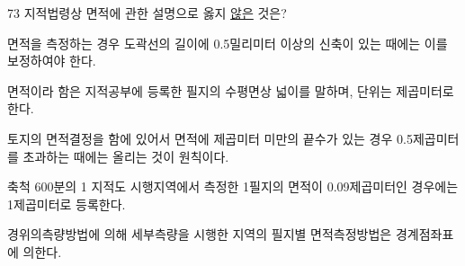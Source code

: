 \begin{question}{73}
지적법령상 면적에 관한 설명으로 옳지 \uline{않은} 것은?
\begin{choices}
  \item 면적을 측정하는 경우 도곽선의 길이에 0.5밀리미터 이상의 신축이 있는 때에는 이를 보정하여야 한다.
  \item 면적이라 함은 지적공부에 등록한 필지의 수평면상 넓이를 말하며, 단위는 제곱미터로 한다.
  \item 토지의 면적결정을 함에 있어서 면적에 제곱미터 미만의 끝수가 있는 경우 0.5제곱미터를 초과하는 때에는 올리는 것이 원칙이다.
  \item 축척 600분의 1 지적도 시행지역에서 측정한 1필지의 면적이 0.09제곱미터인 경우에는 1제곱미터로 등록한다.
  \item 경위의측량방법에 의해 세부측량을 시행한 지역의 필지별 면적측정방법은 경계점좌표에 의한다.
\end{choices}
\end{question}
